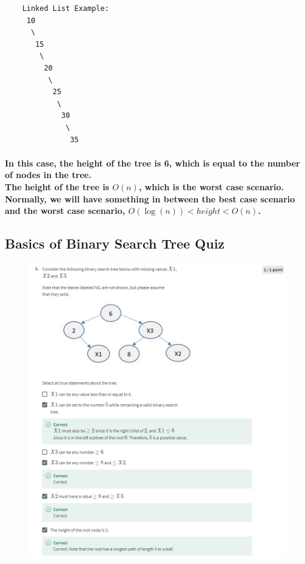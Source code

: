 \documentclass{article}
\begin{document}
\newpage

\begin{verbatim}
    Linked List Example:
     10
      \
       15
        \
         20
          \
           25
            \
             30
              \
               35
\end{verbatim}

\paragraph{
    In this case, the height of the tree is 6, which is equal to the number of nodes in the tree.\\
    The height of the tree is $O(n)$, which is the worst case scenario.\\
    Normally, we will have something in between the best case scenario and the worst case scenario, 
    $O(\log(n)) < height < O(n)$.\\
}

\subsection{Basics of Binary Search Tree Quiz}

\begin{figure}[H]
    \includegraphics[width=\textwidth]{binarysearchtreequiz01.png}
\end{figure}
\end{document}
